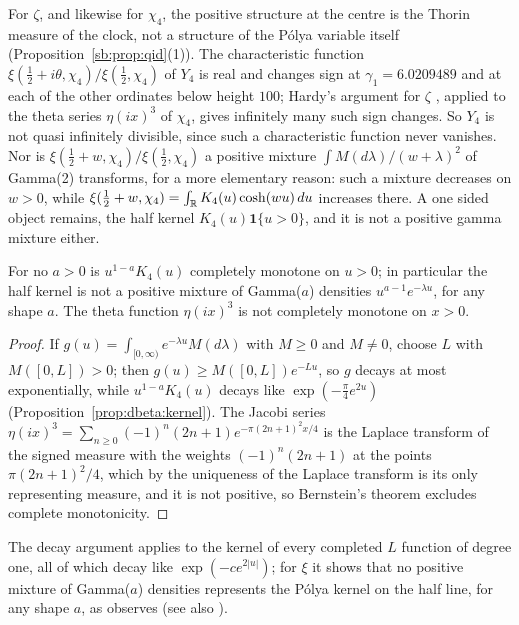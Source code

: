For $\zeta$, and likewise for $\chi_4$, the positive structure at the centre is the Thorin measure of the clock, not a structure of the P\'olya variable itself (Proposition~\ref{sb:prop:qid}(1)). The characteristic function $\xi(\frac12+i\theta,\chi_4)/\xi(\frac12,\chi_4)$ of $Y_4$ is real and changes sign at $\gamma_1=6.0209489$ and at each of the other ordinates below height $100$; Hardy's argument for $\zeta$ \cite[Chapter 10]{Titchmarsh}, applied to the theta series $\eta(ix)^3$ of $\chi_4$, gives infinitely many such sign changes. So $Y_4$ is not quasi infinitely divisible, since such a characteristic function never vanishes. Nor is $\xi(\frac12+w,\chi_4)/\xi(\frac12,\chi_4)$ a positive mixture $\int M(d\lambda)/(w+\lambda)^2$ of Gamma(2) transforms, for a more elementary reason: such a mixture decreases on $w>0$, while $\xi(\frac12+w,\chi_4)=\int_{\mathbb{R}}K_4(u)\cosh(wu)\,du$ increases there. A one sided object remains, the half kernel $K_4(u)\mathbf 1\{u>0\}$, and it is not a positive gamma mixture either.

\begin{proposition}\label{prop:dbeta:nocm}
For no $a>0$ is $u^{1-a}K_4(u)$ completely monotone on $u>0$; in particular the half kernel is not a positive mixture of Gamma($a$) densities $u^{a-1}e^{-\lambda u}$, for any shape $a$. The theta function $\eta(ix)^3$ is not completely monotone on $x>0$.
\end{proposition}

\begin{proof}
If $g(u)=\int_{[0,\infty)}e^{-\lambda u}M(d\lambda)$ with $M\ge0$ and $M\ne0$, choose $L$ with $M([0,L])>0$; then $g(u)\ge M([0,L])e^{-Lu}$, so $g$ decays at most exponentially, while $u^{1-a}K_4(u)$ decays like $\exp(-\frac\pi4e^{2u})$ (Proposition~\ref{prop:dbeta:kernel}). The Jacobi series $\eta(ix)^3=\sum_{n\ge0}(-1)^n(2n+1)e^{-\pi(2n+1)^2x/4}$ is the Laplace transform of the signed measure with the weights $(-1)^n(2n+1)$ at the points $\pi(2n+1)^2/4$, which by the uniqueness of the Laplace transform is its only representing measure, and it is not positive, so Bernstein's theorem excludes complete monotonicity.
\end{proof}

The decay argument applies to the kernel of every completed $L$ function of degree one, all of which decay like $\exp(-ce^{2|u|})$; for $\xi$ it shows that no positive mixture of Gamma($a$) densities represents the P\'olya kernel on the half line, for any shape $a$, as \cite[Section 13.6]{P17} observes (see also \cite[Section 12.6]{P26}).

